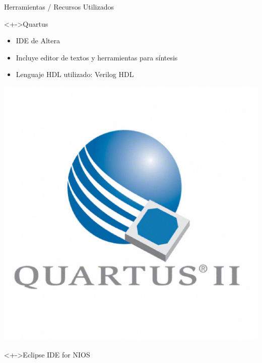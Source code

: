\documentclass[xcolor=dvipsnames]{beamer}
\begin{document}
\begin{frame}{Herramientas / Recursos Utilizados}
\begin{block}<+->{Quartus} 
	
    \begin{itemize}
      \scriptsize
     	\item IDE de Altera
	\item Incluye editor de textos y herramientas para síntesis
	\item Lenguaje HDL utilizado: Verilog HDL
    \end{itemize} 
	\center
	\includegraphics[scale=0.10]{figures/Quartus.eps}  
  \end{block}
  \begin{block}<+->{Eclipse IDE for NIOS}   
	

\end{block}
\end{frame}
\end{document}
